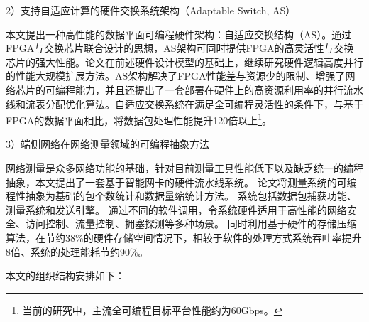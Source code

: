 2）支持自适应计算的硬件交换系统架构（Adaptable Switch, AS）

本文提出一种高性能的数据平面可编程硬件架构：自适应交换结构（AS）。通过FPGA与交换芯片联合设计的思想，AS架构可同时提供FPGA的高灵活性与交换芯片的强大性能。论文在前述硬件设计模型的基础上，继续研究硬件逻辑高度并行的性能大规模扩展方法。AS架构解决了FPGA性能差与资源少的限制、增强了网络芯片的可编程能力，并且还提出了一套部署在硬件上的高资源利用率的并行流水线和流表分配优化算法。自适应交换系统在满足全可编程灵活性的条件下，与基于FPGA的数据平面相比，将数据包处理性能提升120倍以上\footnote{当前的研究中，主流全可编程目标平台性能约为60Gbps。}。


3）端侧网络在网络测量领域的可编程抽象方法

网络测量是众多网络功能的基础，针对目前测量工具性能低下以及缺乏统一的编程抽象，本文提出了一套基于智能网卡的硬件流水线系统。
论文将测量系统的可编程性抽象为基础的包个数统计和数据量缩统计方法。
系统包括数据包捕获功能、测量系统和发送引擎。
通过不同的软件调用，令系统硬件适用于高性能的网络安全、访问控制、流量控制、拥塞探测等多种场景。
同时利用基于硬件的存储压缩算法，在节约38\%的硬件存储空间情况下，相较于软件的处理方式系统吞吐率提升8倍、系统的处理能耗节约90\%。





\label{chap15}

本文的组织结构安排如下：

